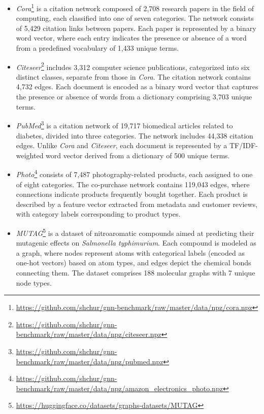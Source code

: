 \begin{itemize}[leftmargin=*]
    \item \emph{Cora}\footnote{\url{https://github.com/shchur/gnn-benchmark/raw/master/data/npz/cora.npz}} \cite{mccallum2000automating} is a citation network composed of 2,708 research papers in the field of computing, each classified into one of seven categories. The network consists of 5,429 citation links between papers. Each paper is represented by a binary word vector, where each entry indicates the presence or absence of a word from a predefined vocabulary of 1,433 unique terms.
    \item \emph{Citeseer}\footnote{\url{https://github.com/shchur/gnn-benchmark/raw/master/data/npz/citeseer.npz}} \cite{sen2008collective} includes 3,312 computer science publications, categorized into six distinct classes, separate from those in \textit{Cora}. The citation network contains 4,732 edges. Each document is encoded as a binary word vector that captures the presence or absence of words from a dictionary comprising 3,703 unique terms.
    \item \emph{PubMed}\footnote{\url{https://github.com/shchur/gnn-benchmark/raw/master/data/npz/pubmed.npz}} \cite{sen2008collective} is a citation network of 19,717 biomedical articles related to diabetes, divided into three categories. The network includes 44,338 citation edges. Unlike \textit{Cora} and \textit{Citeseer}, each document is represented by a TF/IDF-weighted word vector derived from a dictionary of 500 unique terms.
    \item \emph{Photo}\footnote{\url{https://github.com/shchur/gnn-benchmark/raw/master/data/npz/amazon_electronics_photo.npz}} \cite{shchur2018pitfalls} consists of 7,487 photography-related products, each assigned to one of eight categories. The co-purchase network contains 119,043 edges, where connections indicate products frequently bought together. Each product is described by a feature vector extracted from metadata and customer reviews, with category labels corresponding to product types.
    \item \textit{MUTAG}\footnote{\url{https://huggingface.co/datasets/graphs-datasets/MUTAG}} \cite{debnath1991structure} is a dataset of nitroaromatic compounds aimed at predicting their mutagenic effects on \textit{Salmonella typhimurium}. Each compound is modeled as a graph, where nodes represent atoms with categorical labels (encoded as one-hot vectors) based on atom types, and edges depict the chemical bonds connecting them. The dataset comprises 188 molecular graphs with 7 unique node types.
    

\end{itemize}
